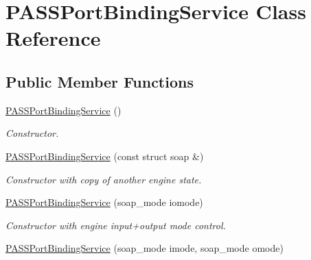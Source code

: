 \hypertarget{classPASSPortBindingService}{
\section{PASSPortBindingService Class Reference}
\label{classPASSPortBindingService}
}
\subsection*{Public Member Functions}
\begin{DoxyCompactItemize}
\item 
\hypertarget{classPASSPortBindingService_ab6efddf401d8b5765046e0108a5193fd}{
\hyperlink{classPASSPortBindingService_ab6efddf401d8b5765046e0108a5193fd}{PASSPortBindingService} ()}
\label{classPASSPortBindingService_ab6efddf401d8b5765046e0108a5193fd}

\begin{DoxyCompactList}\small\item\em Constructor. \item\end{DoxyCompactList}\item 
\hypertarget{classPASSPortBindingService_a3271b369e7b39a2cae8412d36430211b}{
\hyperlink{classPASSPortBindingService_a3271b369e7b39a2cae8412d36430211b}{PASSPortBindingService} (const struct soap \&)}
\label{classPASSPortBindingService_a3271b369e7b39a2cae8412d36430211b}

\begin{DoxyCompactList}\small\item\em Constructor with copy of another engine state. \item\end{DoxyCompactList}\item 
\hypertarget{classPASSPortBindingService_ac5211cb54ea2dbf11cfeb215de19635e}{
\hyperlink{classPASSPortBindingService_ac5211cb54ea2dbf11cfeb215de19635e}{PASSPortBindingService} (soap\_\-mode iomode)}
\label{classPASSPortBindingService_ac5211cb54ea2dbf11cfeb215de19635e}

\begin{DoxyCompactList}\small\item\em Constructor with engine input+output mode control. \item\end{DoxyCompactList}\item 
\hypertarget{classPASSPortBindingService_a8bd50fb66b15865536dade4a9584d199}{
\hyperlink{classPASSPortBindingService_a8bd50fb66b15865536dade4a9584d199}{PASSPortBindingService} (soap\_\-mode imode, soap\_\-mode omode)}
\label{classPASSPortBindingService_a8bd50fb66b15865536dade4a9584d199}


\end{DoxyCompactItemize}
